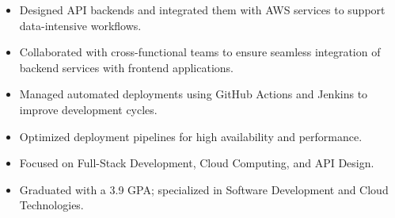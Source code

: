 \par\smallskip
\noindent
\begin{minipage}{20cm}
  \begin{minipage}{9.75cm}
    \begin{itemize}
      \item Designed API backends and integrated them with AWS services to support data-intensive workflows.
      \item Collaborated with cross-functional teams to ensure seamless integration of backend services with frontend applications.
    \end{itemize}
  \end{minipage}
  \hfill
  \begin{minipage}{9.75cm}
    \begin{itemize}
      \item Managed automated deployments using GitHub Actions and Jenkins to improve development cycles.
      \item Optimized deployment pipelines for high availability and performance.
    \end{itemize}
  \end{minipage}
\end{minipage}
\par\smallskip
\divider

\begin{itemize}
  \item Focused on Full-Stack Development, Cloud Computing, and API Design.
\end{itemize}
\divider

\begin{itemize}
  \item Graduated with a 3.9 GPA; specialized in Software Development and Cloud Technologies.
\end{itemize}

\noindent
\begin{minipage}{20cm}
\end{minipage}


